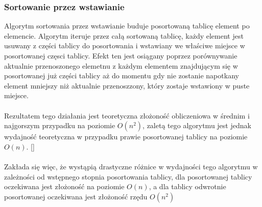 \documentclass{article}
\begin{document}
      \subsubsection{Sortowanie przez wstawianie}
        Algorytm sortowania przez wstawianie buduje posortowaną tablicę element po elemencie. Algorytm iteruje przez całą sortowaną tablicę, każdy element jest usuwany z części tablicy do posortowania i wstawiany we właściwe miejsce w posortowanej częsci tablicy.
        Efekt ten jest osiągany poprzez porównywanie aktualnie przenoszonego elemetnu z każdym elementem znajdującym się w posortowanej już części tablicy aż do momentu gdy nie zostanie napotkany element mniejszy niż aktualnie przenoszzony, który zostaje wstawiony w puste miejsce.
        \\\\Rezultatem tego działania jest teoretyczna złożoność obliczeniowa w średnim i najgorszym przypadku na poziomie $O(n^2)$,
        zaletą tego algorytmu jest jednak wydajność teoretyczna w przypadku prawie posortowanej tablicy na poziomie $O(n)$. [\cite{wikiInsert}]
        \\\\Zakłada się więc, że wystąpią drastyczne różnice w wydajności tego algorytmu w zależności od wstępnego stopnia posortowania tablicy, dla posortowanej tablicy oczekiwana jest złożoność na poziomie $O(n)$, a dla tablicy odwrotnie posortowanej oczekiwana jest złożoność rzędu $O(n^2)$
\end{document}
